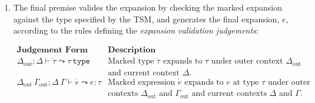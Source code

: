 \begin{enumerate}
\begin{figure}
$\begin{array}{lllllll}
\textbf{Sort} & & & \textbf{Abstract Form} & \textbf{Stylized Form} & \textbf{Description}\\
\mathsf{UExp} & \ue & ::= & x & x & \text{variable}\\
&&& \aulam{\tau}{x}{e} & \lam{x}{\tau}{e} & \text{abstraction}\\
&&& \auap{e}{e} & \ap{e}{e} & \text{application}\\
&&& \autlam{t}{e} & \Lam{t}{e} & \text{type abstraction}\\
&&& \autap{e}{\tau} & \App{e}{\tau} & \text{type application}\\
&&& \aufold{t}{\tau}{e} & \fold{e} & \text{fold}\\
&&& \auunfold{e} & \unfold{e} & \text{unfold}\\
&&& \autpl{\mapschema{e}{i}{\labelset}} & \tpl{\mapschema{e}{i}{\labelset}} & \text{labeled tuple}\\
&&& \aupr{\ell}{e} & \prj{e}{\ell} & \text{projection}\\
&&& \auin{\ell}{\mapschema{\tau}{i}{\labelset}}{e} & \inj{\ell}{e} & \text{injection}\\
&&& \aucase{e}{\mapschemab{x}{e}{i}{\labelset}} & \caseof{e}{\mapschemab{x}{e}{i}{\labelset}} & \text{case analysis}\\
&&& \auletsyntax{\tau}{\ue}{\tsmv}{\ue} & \uletsyntax{\tsmv}{\tau}{\ue}{\ue} & \text{macro definition}\\
&&& \autsmap{b}{\tsmv} & \utsmap{\tsmv}{b} & \text{macro application}
\end{array}$
\caption[Syntax of unexpanded expressions in $\miniVerseU$.]{Syntax of unexpanded expressions in $\miniVerseU$. Metavariable $\tsmv$ ranges over macro identifiers and $b$ ranges over literal bodies.}
\label{fig:U-candidate-terms}
\end{figure}



\item The final premise valides the expansion by checking the marked expansion against the type specified by the TSM, and generates the final expansion, $e$, according to the rules defining the \emph{expansion validation judgements}:

$\begin{array}{ll}
\textbf{Judgement Form} & \textbf{Description}\\
\Delta_\text{out}; \Delta \vdash \dot{\tau} \leadsto \tau~\mathtt{type} & \text{Marked type $\dot{\tau}$ expands to $\tau$ under outer context $\Delta_\text{out}$}\\
& \text{and current context $\Delta$.}\\
\Delta_\text{out}~\Gamma_\text{out}; \Delta~\Gamma \vdash \dot{e} \leadsto e : \tau & \text{Marked expression $\dot{e}$ expands to $e$ at type $\tau$ under outer}\\
& \text{contexts $\Delta_\text{out}$ and $\Gamma_\text{out}$ and current contexts $\Delta$ and $\Gamma$.}
\end{array}$


\end{enumerate}
